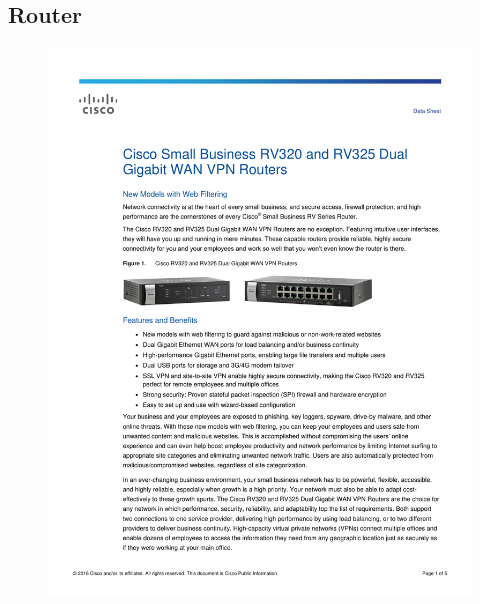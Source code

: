 \documentclass[a4paper, 12pt]{article}
\begin{document}
\subsection{Router}
\begin{figure}[H]
\centering
    \includegraphics[scale=0.80]{spec/router.pdf}
    \label{fig:PropProf}
\end{figure}
\end{document}
